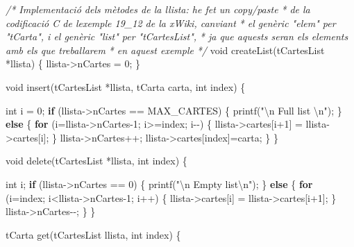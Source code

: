 \documentclass[
]{book}
\newenvironment{Shaded}{\begin{snugshade}}{\end{snugshade}}
\newcommand{\CommentTok}[1]{\textcolor[rgb]{0.56,0.35,0.01}{\textit{#1}}}
\newcommand{\ControlFlowTok}[1]{\textcolor[rgb]{0.13,0.29,0.53}{\textbf{#1}}}
\newcommand{\DataTypeTok}[1]{\textcolor[rgb]{0.13,0.29,0.53}{#1}}
\newcommand{\DecValTok}[1]{\textcolor[rgb]{0.00,0.00,0.81}{#1}}
\newcommand{\NormalTok}[1]{#1}
\newcommand{\SpecialCharTok}[1]{\textcolor[rgb]{0.00,0.00,0.00}{#1}}
\newcommand{\StringTok}[1]{\textcolor[rgb]{0.31,0.60,0.02}{#1}}
\begin{document}
\begin{Shaded}
\begin{Highlighting}[]
\CommentTok{/* Implementació dels mètodes de la llista: he fet un copy/paste}
\CommentTok{ * de la codificació C de l\textquotesingle{}exemple 19\_12 de la xWiki, canviant}
\CommentTok{ * el genèric "elem" per "tCarta", i el genèric "list" per "tCartesList",}
\CommentTok{ * ja que aquests seran els elements amb els que treballarem}
\CommentTok{ * en aquest exemple }
\CommentTok{ */}
\DataTypeTok{void}\NormalTok{ createList(tCartesList *llista) \{}
\NormalTok{    llista{-}\textgreater{}nCartes = }\DecValTok{0}\NormalTok{;}
\NormalTok{\}}

\DataTypeTok{void}\NormalTok{ insert(tCartesList *llista, tCarta carta, }\DataTypeTok{int}\NormalTok{ index) \{}

    \DataTypeTok{int}\NormalTok{ i = }\DecValTok{0}\NormalTok{;}
    \ControlFlowTok{if}\NormalTok{ (llista{-}\textgreater{}nCartes == MAX\_CARTES) \{}
\NormalTok{        printf(}\StringTok{"}\SpecialCharTok{\textbackslash{}n}\StringTok{ Full list }\SpecialCharTok{\textbackslash{}n}\StringTok{"}\NormalTok{);}
\NormalTok{    \} }\ControlFlowTok{else}\NormalTok{ \{}
        \ControlFlowTok{for}\NormalTok{ (i=llista{-}\textgreater{}nCartes{-}}\DecValTok{1}\NormalTok{; i\textgreater{}=index; i{-}{-}) \{}
\NormalTok{            llista{-}\textgreater{}cartes[i+}\DecValTok{1}\NormalTok{] = llista{-}\textgreater{}cartes[i];}
\NormalTok{        \}}
\NormalTok{        llista{-}\textgreater{}nCartes++;}
\NormalTok{        llista{-}\textgreater{}cartes[index]=carta;}
\NormalTok{    \}}
\NormalTok{\}}

\DataTypeTok{void}\NormalTok{ delete(tCartesList *llista, }\DataTypeTok{int}\NormalTok{ index) \{}

    \DataTypeTok{int}\NormalTok{ i;}
    \ControlFlowTok{if}\NormalTok{ (llista{-}\textgreater{}nCartes == }\DecValTok{0}\NormalTok{) \{}
\NormalTok{        printf(}\StringTok{"}\SpecialCharTok{\textbackslash{}n}\StringTok{ Empty list}\SpecialCharTok{\textbackslash{}n}\StringTok{"}\NormalTok{);}
\NormalTok{    \} }\ControlFlowTok{else}\NormalTok{ \{}
        \ControlFlowTok{for}\NormalTok{ (i=index; i\textless{}llista{-}\textgreater{}nCartes{-}}\DecValTok{1}\NormalTok{; i++) \{}
\NormalTok{            llista{-}\textgreater{}cartes[i] = llista{-}\textgreater{}cartes[i+}\DecValTok{1}\NormalTok{];}
\NormalTok{        \}}
\NormalTok{        llista{-}\textgreater{}nCartes{-}{-};}
\NormalTok{    \}}
\NormalTok{\}}

\NormalTok{tCarta get(tCartesList llista, }\DataTypeTok{int}\NormalTok{ index) \{}


\end{Highlighting}
\end{Shaded}
\end{document}
